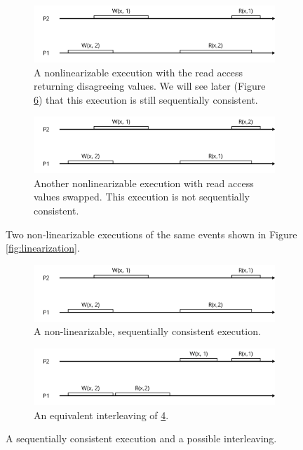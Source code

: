 \documentclass[]             %
{NASA}                       %
\theoremstyle{definition}
\begin{document}
\begin{figure}[p]
  \begin{subfigure}[a]{1\textwidth}
    \center
    \includegraphics[scale=0.4]{images/nonlinear1.png}
    \caption{A nonlinearizable execution with the read access returning disagreeing values. We will see later (Figure \ref{fig:sequential}) that this execution is still sequentially consistent. }
    \label{fig:nonlinear1}
  \end{subfigure}
  \begin{subfigure}[b]{1\textwidth}
    \center
    \includegraphics[scale=0.4]{images/nonlinear2.png}
    \caption{Another nonlinearizable execution with read access values swapped. This execution is not sequentially consistent.}
    \label{fig:nonlinear2}
  \end{subfigure}
  \caption{Two non-linearizable executions of the same events shown in Figure \ref{fig:linearization}.}
  \label{fig:nonlinearizable}
\end{figure}

\begin{figure}
  \begin{subfigure}[a]{1\textwidth}
    \center
    \includegraphics[scale=0.4]{images/sequential1.png}
    \caption{A non-linearizable, sequentially consistent execution.}
    \label{fig:sequential1}
  \end{subfigure}
  \begin{subfigure}[b]{1\textwidth}
    \center
    \includegraphics[scale=0.4]{images/sequential2.png}
    \caption{An equivalent interleaving of \ref{fig:sequential1}.}
    \label{fig:interleaving1}
  \end{subfigure}
  \caption{A sequentially consistent execution and a possible interleaving.}
  \label{fig:sequential}
\end{figure}
\end{document}
